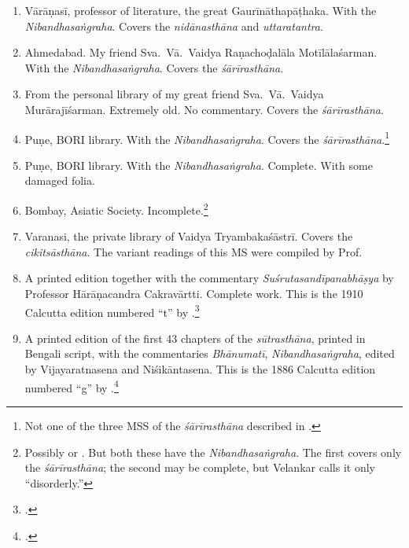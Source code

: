 \begin{enumerate}
    
    \item[1] Vārāṇasī, professor of literature, the great Gaurīnāthapāṭhaka.  With 
    the 
    \emph{Nibandhasaṅgraha}. Covers the \emph{nidānasthāna} and 
    \emph{uttaratantra}.
    
    \item [2]  Ahmedabad.  My friend Sva.\ Vā.\ Vaidya Raṇachoḍalāla 
    Motīlālaśarman.  
    With the \emph{Nibandhasaṅgraha}.  Covers the \emph{śārīrasthāna}.
    
    \item [3] From the personal library of my great friend Sva.\ Vā.\ Vaidya
    Murārajīśarman. Extremely old. No commentary.  Covers the 
    \emph{śārīrasthāna}.
    
    \item [4]  Puṇe, BORI library.  With the \emph{Nibandhasaṅgraha}. Covers the
    \emph{śārīrasthāna}.\footnote{Not one of the three MSS of the
    \emph{śārīrasthāna} described in \cite{shar-vaid}.}
    
    \item [5]  Puṇe, BORI library.  With the \emph{Nibandhasaṅgraha}. Complete.  
    With some damaged folia.
    
    \item [6]  Bombay, Asiatic Society.  Incomplete.\footnote{Possibly 
     or  \citep[v.\,1, \# 212 and 
    213]{vela-1930}.  But both these have the \emph{Nibandhasaṅgraha}.  The 
    first 
    covers only the \emph{śārīrasthāna}; the second may be complete, but 
    Velankar calls it 
    only “disorderly.”}
    
    \item [7] Varanasi, the private library of Vaidya Tryambakaśāstrī.  Covers the 
    \emph{cikitsāsthāna}.  The variant readings of this MS were compiled by Prof.\ 
    
    \item [8]  A printed edition together with the commentary 
    \emph{Suśrutasandīpanabhāṣya} by Professor Hārāṇacandra Cakravārtti. 
    Complete work.
    This is the 1910 Calcutta edition numbered “t” by \citet[IB, 
    312]{meul-hist}.\footcite{bhat-1917}
    
    \item [9] A printed edition of the first 43 chapters of the
    \emph{sūtrasthāna}, printed in Bengali script, with the commentaries
    \emph{Bhānumatī}, \emph{Nibandhasaṅgraha}, edited by Vijayaratnasena and
    Niśikāntasena. This is the 1886 Calcutta edition numbered “g” by \citet[IB,
    311]{meul-hist}.\footcite{sena-1886}
    
\end{enumerate}

